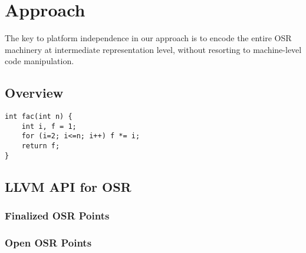 \section{Approach}
\label{se:approach}

The key to platform independence in our approach is to encode the entire OSR machinery at intermediate representation level, without resorting to machine-level code manipulation.

\subsection{Overview}

\begin{verbatim}
int fac(int n) {
    int i, f = 1;
    for (i=2; i<=n; i++) f *= i;
    return f;
}
\end{verbatim}

\subsection{LLVM API for OSR}

\subsubsection{Finalized OSR Points}

\subsubsection{Open OSR Points}


  
  
  
  
  
  
  